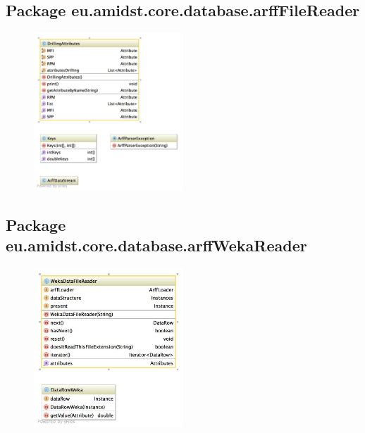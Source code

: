\subsection{Package eu.amidst.core.database.arffFileReader}

\begin{figure}[H]
  \centering
    \includegraphics[width=0.5\textwidth]{ClassDiagrams/core_database_filereaders_arfffilereader.jpg}
\end{figure}

\subsection{Package eu.amidst.core.database.arffWekaReader}
\begin{figure}[H]
  \centering
    \includegraphics[width=0.5\textwidth]{ClassDiagrams/core_database_filereaders_arffwekareader.jpg}
\end{figure}

